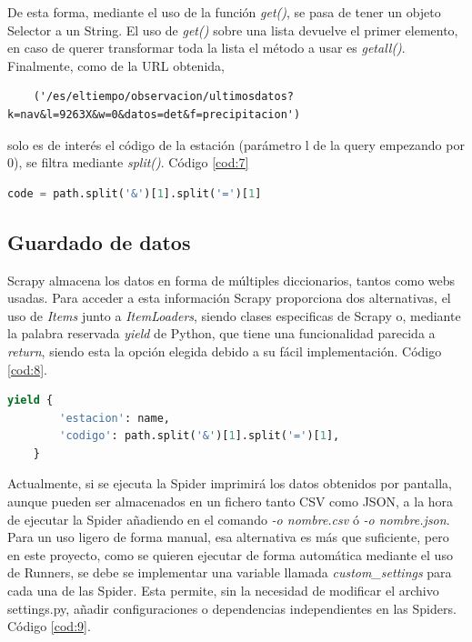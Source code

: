 De esta forma, mediante el uso de la función \textit{get()}, se pasa de tener un objeto Selector a un String. El uso de \textit{get()} sobre una lista devuelve el primer elemento, en caso de querer transformar toda la lista el método a usar es \textit{getall()}.\newline
\newline
Finalmente, como de la URL obtenida,
\begin{verbatim}
	('/es/eltiempo/observacion/ultimosdatos?k=nav&l=9263X&w=0&datos=det&f=precipitacion')
\end{verbatim}
solo es de interés el código de la estación (parámetro l de la query empezando por 0), se filtra mediante \textit{split()}. Código \ref{cod:7}

\begin{lstlisting}[language=Python, caption={Filtrado del código de estación de la URL en Aemet}, label=cod:7]
	code = path.split('&')[1].split('=')[1]
\end{lstlisting}

\subsection{Guardado de datos}
Scrapy almacena los datos en forma de múltiples diccionarios, tantos como webs usadas. Para acceder a esta información Scrapy proporciona dos alternativas, el uso de \textit{Items} junto a \textit{ItemLoaders}, siendo clases especificas de Scrapy o, mediante la palabra reservada \textit{yield} de Python, que tiene una funcionalidad parecida a \textit{return}, siendo esta la opción elegida debido a su fácil implementación. Código \ref{cod:8}.

\begin{lstlisting}[language=Python, caption={Guardar datos mediante el uso de \textit{yield}}, label=cod:8]
	yield {
		'estacion': name,
		'codigo': path.split('&')[1].split('=')[1],
	}
\end{lstlisting}

Actualmente, si se ejecuta la Spider imprimirá los datos obtenidos por pantalla, aunque pueden ser almacenados en un fichero tanto CSV como JSON, a la hora de ejecutar la Spider añadiendo en el comando \textit{-o nombre.csv} ó \textit{-o nombre.json}.\newline
\newline
Para un uso ligero de forma manual, esa alternativa es más que suficiente, pero en este proyecto, como se quieren ejecutar de forma automática mediante el uso de Runners, se debe se implementar una variable llamada \textit{custom\_settings} para cada una de las Spider. Esta permite, sin la necesidad de modificar el archivo settings.py, añadir configuraciones o dependencias independientes en las Spiders. Código \ref{cod:9}.

